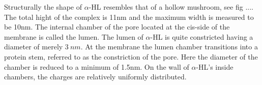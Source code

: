 Structurally the shape of $\alpha$-HL resembles that of a hollow mushroom, see fig ....
The total hight of the complex is 11nm and the maximum width is measured to be 10nm. The
internal chamber of the pore located at the cis-side of the membrane is called the lumen.
The lumen of $\alpha$-HL is quite constricted having a diameter of merely $3\ nm$.  At
the membrane the lumen chamber transitions into a protein stem, referred to as the
constriction of the pore. Here the diameter of the chamber is reduced to a minimum of
1.5nm. On the wall of $\alpha$-HL's inside chambers, the charges are relatively uniformly
distributed.

%
%
%

